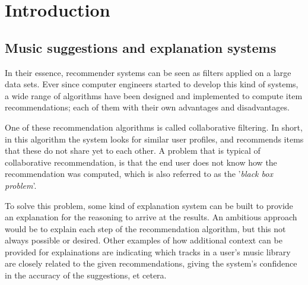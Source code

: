 \chapter{Introduction}\label{chapter:introduction}


\section{Music suggestions and explanation systems}\label{chapter:introduction:section:context}

In their essence, recommender systems can be seen as filters applied on a large data sets. Ever since computer engineers started to develop this kind of systems, a wide range of algorithms have been designed and implemented to compute item recommendations\cite{burke:2002, melville:2002:CCF:777092.777124, pazzani:2007:CRS:1768197.1768209, rajaraman:2012}; each of them with their own advantages and disadvantages.

One of these recommendation algorithms is called collaborative filtering. In short, in this algorithm the system looks for similar user profiles, and recommends items that these do not share yet to each other\cite{rajaraman:2012}. A problem that is typical of collaborative recommendation, is that the end user does not know how the recommendation was computed, which is also referred to as the '\emph{black box problem}'\cite{herlocker:2000}.

To solve this problem, some kind of explanation system can be built to provide an explanation for the reasoning to arrive at the results. An ambitious approach would be to explain each step of the recommendation algorithm, but this not always possible or desired. Other examples of how additional context can be provided for explainations are indicating which tracks in a user's music library are closely related to the given recommendations, giving the system's confidence in the accuracy of the suggestions, et cetera\cite{herlocker:2000}.

